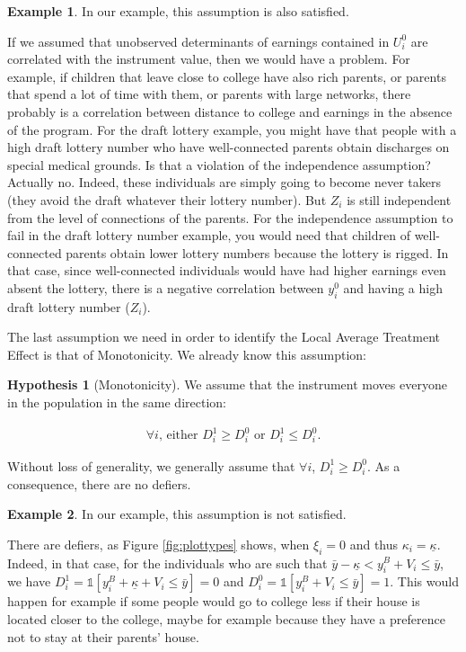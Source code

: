 \documentclass[
]{book}
\newcommand{\uns}[1]{\mathds{1}[ #1 ]}
\theoremstyle{definition}
\theoremstyle{definition}
\newtheorem{example}{Example}[chapter]
\theoremstyle{definition}
\theoremstyle{definition}
\newtheorem{hypothesis}{Hypothesis}[chapter]
\theoremstyle{remark}
\begin{document}
\begin{example}
\protect\hypertarget{exm:unnamed-chunk-143}{}{\label{exm:unnamed-chunk-143} }In our example, this assumption is also satisfied.
\end{example}
If we assumed that unobserved determinants of earnings contained in \(U^0_i\) are correlated with the instrument value, then we would have a problem.
For example, if children that leave close to college have also rich parents, or parents that spend a lot of time with them, or parents with large networks, there probably is a correlation between distance to college and earnings in the absence of the program.
For the draft lottery example, you might have that people with a high draft lottery number who have well-connected parents obtain discharges on special medical grounds.
Is that a violation of the independence assumption?
Actually no.
Indeed, these individuals are simply going to become never takers (they avoid the draft whatever their lottery number).
But \(Z_i\) is still independent from the level of connections of the parents.
For the independence assumption to fail in the draft lottery number example, you would need that children of well-connected parents obtain lower lottery numbers because the lottery is rigged.
In that case, since well-connected individuals would have had higher earnings even absent the lottery, there is a negative correlation between \(y_i^0\) and having a high draft lottery number (\(Z_i\)).

The last assumption we need in order to identify the Local Average Treatment Effect is that of Monotonicity.
We already know this assumption:

\begin{hypothesis}[Monotonicity]
\protect\hypertarget{hyp:MonotonicityIV}{}{\label{hyp:MonotonicityIV} \iffalse (Monotonicity) \fi{} }We assume that the instrument moves everyone in the population in the same direction:

\begin{align*}
\forall i\text{, either } D^1_i\geq D_i^0 \text{ or } D^1_i\leq D_i^0.
\end{align*}
\end{hypothesis}

Without loss of generality, we generally assume that \(\forall i\), \(D^1_i\geq D_i^0\).
As a consequence, there are no defiers.

\begin{example}
\protect\hypertarget{exm:unnamed-chunk-144}{}{\label{exm:unnamed-chunk-144} }In our example, this assumption is not satisfied.
\end{example}
There are defiers, as Figure \ref{fig:plottypes} shows, when \(\xi_i = 0\) and thus \(\kappa_i=\underline{\kappa}\).
Indeed, in that case, for the individuals who are such that \(\bar{y}-\underline{\kappa}<y_i^B+V_i\leq\bar{y}\), we have \(D^1_i=\uns{y_i^B+\underline{\kappa} + V_i\leq\bar{y}}=0\) and \(D^0_i=\uns{y_i^B + V_i\leq\bar{y}}=1\).
This would happen for example if some people would go to college less if their house is located closer to the college, maybe for example because they have a preference not to stay at their parents' house.
\end{document}

